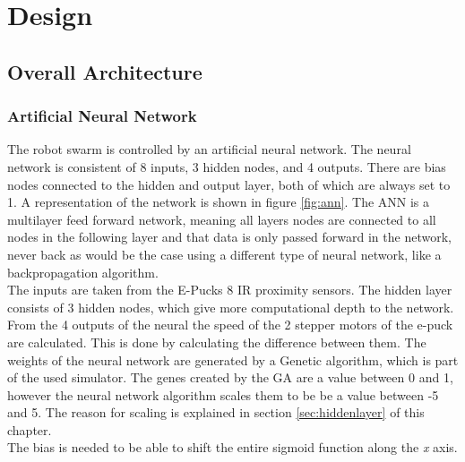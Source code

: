 \chapter{Design}

\section{Overall Architecture}

\subsection{Artificial Neural Network}
The robot swarm is controlled by an artificial neural network. 
The neural network is consistent of 8 inputs, 3 hidden nodes, and 4 outputs. 
There are bias nodes connected to the hidden and output layer, both of which are always set to 1. 
A representation of the network is shown in figure \ref{fig:ann}. 
The ANN is a multilayer feed forward network, meaning all layers nodes are connected to all nodes in the following layer and that data is only passed forward in the network, never back as would be the case using a different type of neural network, like a backpropagation algorithm. \\

The inputs are taken from the E-Pucks 8 IR proximity sensors. The hidden layer consists of 3 hidden nodes, which give more computational depth to the network. 
From the 4 outputs of the neural the speed of the 2 stepper motors of the e-puck are calculated. This is done by calculating the difference between them. 
The weights of the neural network are generated by a Genetic algorithm, which is part of the used simulator. The genes created by the GA are a value between 0 and 1, however the neural network algorithm scales them to be be a value between -5 and 5. 
The reason for scaling is explained in section \ref{sec:hiddenlayer} of this chapter.\\



The bias is needed to be able to shift the entire sigmoid function along the \textit{x} axis. 

